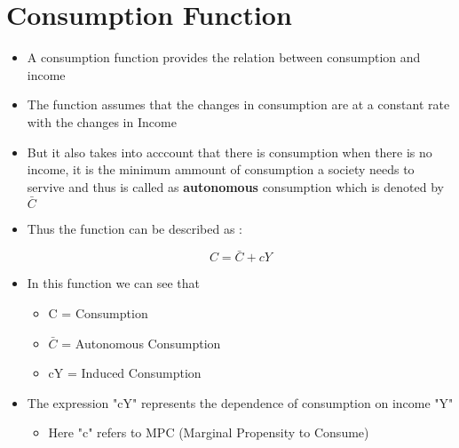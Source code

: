 \documentclass[11pt]{article}
\begin{document}
\section{Consumption Function}
\label{sec:orgb7f39b8}
\begin{itemize}
\item A consumption function provides the relation between consumption and income
\item The function assumes that the changes in consumption are at a constant rate with the changes in Income
\item But it also takes into acccount that there is consumption when there is no income, it is the minimum ammount of consumption a society needs to servive and thus is called as \textbf{autonomous} consumption which is denoted by \(\bar{C}\)
\item Thus the function can be described as :

$$
  C = \bar{C} + cY
  $$

\item In this function we can see that
\begin{itemize}
\item C = Consumption

\item \(\bar{C}\) = Autonomous Consumption

\item cY = Induced Consumption
\end{itemize}
\item The expression "cY" represents the dependence of consumption on income "Y"
\begin{itemize}
\item Here "c" refers to MPC (Marginal Propensity to Consume)
\end{itemize}
\end{itemize}
\end{document}
